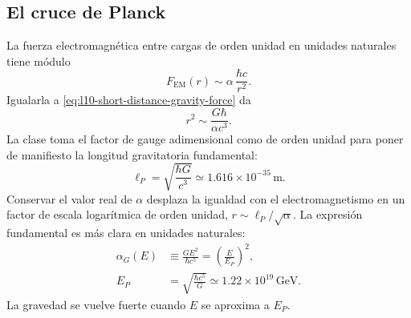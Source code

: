 \subsection{El cruce de Planck}

La fuerza electromagnética entre cargas de orden unidad en unidades naturales tiene módulo
\begin{equation}
  F_{\mathrm{EM}}(r)
  \sim
  \alpha\,\frac{\hbar c}{r^2}.
  \label{eq:l10-em-force-alpha}
\end{equation}
Igualarla a \eqref{eq:l10-short-distance-gravity-force} da
\begin{equation}
  r^2\sim\frac{G\hbar}{\alpha c^3}.
  \label{eq:l10-gravity-em-crossing}
\end{equation}
La clase toma el factor de gauge adimensional como de orden unidad para poner de manifiesto la longitud gravitatoria fundamental:
\begin{equation}
  \boxed{\ell_P=\sqrt{\frac{\hbar G}{c^3}}}
  \simeq1.616\times10^{-35}\,\mathrm{m}.
  \label{eq:l10-planck-length}
\end{equation}
Conservar el valor real de \(\alpha\) desplaza la igualdad con el electromagnetismo en un factor de escala logarítmica de orden unidad, \(r\sim\ell_P/\sqrt\alpha\). La expresión fundamental es más clara en unidades naturales:
\begin{equation}
\begin{aligned}
  \alpha_G(E)
  &\equiv\frac{GE^2}{\hbar c^5}
  =\left(\frac{E}{E_P}\right)^2,
  \\
  E_P
  &=\sqrt{\frac{\hbar c^5}{G}}
  \simeq1.22\times10^{19}\,\mathrm{GeV}.
\end{aligned}
  \label{eq:l10-gravitational-coupling}
\end{equation}
La gravedad se vuelve fuerte cuando \(E\) se aproxima a \(E_P\).

\begin{classroomqa}
\end{classroomqa}

\begin{classroomqa}
\end{classroomqa}

